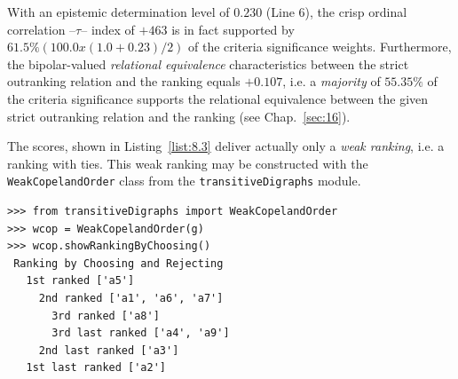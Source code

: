 With an epistemic determination level of $0.230$ (Line 6), the crisp ordinal correlation --\Kendall $\tau$-- index of $+463$ is in fact supported by $61.5\% (100.0 x (1.0 + 0.23)/2)$ of the criteria significance weights. Furthermore, the bipolar-valued \emph{relational equivalence} characteristics between the strict outranking relation and the \Copeland ranking equals $+0.107$, i.e. a \emph{majority} of $55.35\%$ of the criteria significance supports the relational equivalence between the given strict outranking relation and the \Copeland ranking (see Chap.~\ref{sec:16}).

The \Copeland scores, shown in Listing~\vref{list:8.3} deliver actually only a \emph{weak ranking}, i.e. a ranking with ties. This weak ranking may be constructed with the \texttt{WeakCopelandOrder} class  from the \texttt{transitiveDigraphs} module.
\begin{lstlisting}[caption={Computing a weak \Copeland ranking},label=list:8.5]
>>> from transitiveDigraphs import WeakCopelandOrder
>>> wcop = WeakCopelandOrder(g)
>>> wcop.showRankingByChoosing()
 Ranking by Choosing and Rejecting
   1st ranked ['a5']
     2nd ranked ['a1', 'a6', 'a7']
       3rd ranked ['a8']
       3rd last ranked ['a4', 'a9']
     2nd last ranked ['a3']
   1st last ranked ['a2']
\end{lstlisting}


